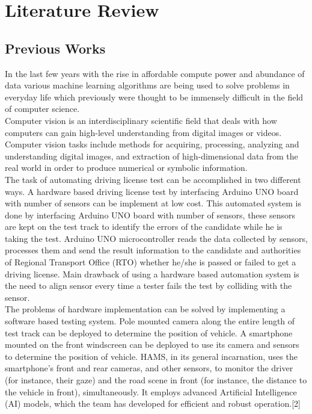 \chapter{Literature Review}
\section{Previous Works}
In the last few years with the rise in affordable compute power and abundance of data various machine learning algorithms are being used to solve problems in everyday life which previously were thought to be immensely difficult in the field of computer science.
\\
Computer vision is an interdisciplinary scientific field that deals with how computers can gain high-level understanding from digital images or videos. Computer vision tasks include methods for acquiring, processing, analyzing and understanding digital images, and extraction of high-dimensional data from the real world in order to produce numerical or symbolic information.\\
The task of automating driving license test can be accomplished in two different ways. A hardware based driving license test by interfacing Arduino UNO board with number of sensors can be implement at low cost. This automated system is done by interfacing Arduino UNO board with number of sensors, these sensors are kept on the test track to identify the errors of the candidate while he is taking the test. Arduino UNO microcontroller reads the data collected by sensors, processes them and send the result information to the candidate and authorities of Regional Transport Office (RTO) whether he/she is passed or failed to get a driving license\cite{femto_anup}. Main drawback of using a hardware based automation system is the need to align sensor every time a tester fails the test by colliding with the sensor. 
\\
The problems of hardware implementation can be solved by implementing a software based testing system. Pole mounted camera along the entire length of test track can be deployed to determine the position of vehicle. A smartphone mounted on the front windscreen can be deployed to use its camera and sensors to determine the position of vehicle.
HAMS, in its general incarnation, uses the smartphone’s front and rear cameras, and other sensors, to monitor the driver (for instance, their gaze) and the road scene in front (for instance, the distance to the vehicle in front), simultaneously. It employs advanced Artificial Intelligence (AI) models, which the team has developed for efficient and robust operation\cite{bordia2020automated}.[2]

